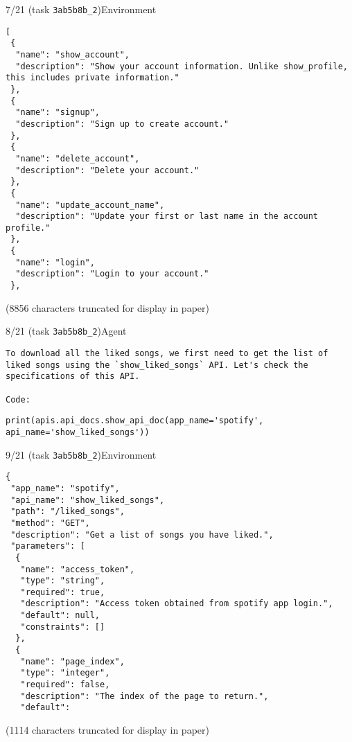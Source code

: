 \hspace*{8mm}%
\begin{minipage}{0.95\linewidth}
\begin{user_message_box}{{7/21 (task \texttt{3ab5b8b\_2})\hfill Environment}}
\scriptsize
\begin{Verbatim}[breaklines]
[
 {
  "name": "show_account",
  "description": "Show your account information. Unlike show_profile, this includes private information."
 },
 {
  "name": "signup",
  "description": "Sign up to create account."
 },
 {
  "name": "delete_account",
  "description": "Delete your account."
 },
 {
  "name": "update_account_name",
  "description": "Update your first or last name in the account profile."
 },
 {
  "name": "login",
  "description": "Login to your account."
 },
\end{Verbatim}
(8856 characters truncated for display in paper)\end{user_message_box}
\end{minipage}

\begin{minipage}{0.95\linewidth}
\begin{assistant_message_box}{{8/21 (task \texttt{3ab5b8b\_2})\hfill Agent}}
\scriptsize
\begin{Verbatim}[breaklines]
To download all the liked songs, we first need to get the list of liked songs using the `show_liked_songs` API. Let's check the specifications of this API.

Code:
\end{Verbatim}
\begin{tcolorbox}[colback=codebgcolor,boxrule=0pt]\begin{Verbatim}[breaklines]
print(apis.api_docs.show_api_doc(app_name='spotify', api_name='show_liked_songs'))
\end{Verbatim}
\end{tcolorbox}\end{assistant_message_box}
\end{minipage}

\hspace*{8mm}%
\begin{minipage}{0.95\linewidth}
\begin{user_message_box}{{9/21 (task \texttt{3ab5b8b\_2})\hfill Environment}}
\scriptsize
\begin{Verbatim}[breaklines]
{
 "app_name": "spotify",
 "api_name": "show_liked_songs",
 "path": "/liked_songs",
 "method": "GET",
 "description": "Get a list of songs you have liked.",
 "parameters": [
  {
   "name": "access_token",
   "type": "string",
   "required": true,
   "description": "Access token obtained from spotify app login.",
   "default": null,
   "constraints": []
  },
  {
   "name": "page_index",
   "type": "integer",
   "required": false,
   "description": "The index of the page to return.",
   "default":
\end{Verbatim}
(1114 characters truncated for display in paper)\end{user_message_box}
\end{minipage}

